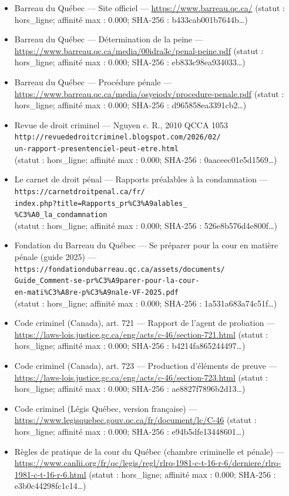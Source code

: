 \documentclass[12pt,letterpaper,oneside]{article}
\begin{document}
\begin{itemize}[leftmargin=*]
\item Barreau du Québec — Site officiel — \url{https://www.barreau.qc.ca/} (statut : hors\_ligne; affinité max : 0.000; SHA-256 : b433cab001b7644b…)
\item Barreau du Québec — Détermination de la peine — \url{https://www.barreau.qc.ca/media/00idra3c/penal-peine.pdf} (statut : hors\_ligne; affinité max : 0.000; SHA-256 : eb833c98ea934033…)
\item Barreau du Québec — Procédure pénale — \url{https://www.barreau.qc.ca/media/osyeiodv/procedure-penale.pdf} (statut : hors\_ligne; affinité max : 0.000; SHA-256 : d965858ea3391cb2…)
\item Revue de droit criminel — Nguyen c. R., 2010 QCCA 1053\\
\texttt{http://revuededroitcriminel.blogspot.com/2026/02/}\\
\texttt{un-rapport-presentenciel-peut-etre.html}\\
{\footnotesize
(statut : hors\_ligne; affinité max : 0.000; SHA-256 : 0aaceec01e5d1569…)
}
\item Le carnet de droit pénal — Rapports préalables à la condamnation —\\
\texttt{https://carnetdroitpenal.ca/fr/}\\
\texttt{index.php?title=Rapports\_pr\%C3\%A9alables\_}\\
\texttt{\%C3\%A0\_la\_condamnation}\\
{\footnotesize (statut : hors\_ligne; affinité max : 0.000; SHA-256 : 526e8b576d4e800f…)}
\item Fondation du Barreau du Québec — Se préparer pour la cour en matière pénale (guide 2025) —\\
\texttt{https://fondationdubarreau.qc.ca/assets/documents/}\\
\texttt{Guide\_Comment-se-pr\%C3\%A9parer-pour-la-cour-}\\
\texttt{en-mati\%C3\%A8re-p\%C3\%A9nale-VF-2025.pdf}\\
{\footnotesize (statut : hors\_ligne; affinité max : 0.000; SHA-256 : 1a531a683a74c51f…)}
\item Code criminel (Canada), art. 721 — Rapport de l'agent de probation — \url{https://laws-lois.justice.gc.ca/eng/acts/c-46/section-721.html} (statut : hors\_ligne; affinité max : 0.000; SHA-256 : b4214fa865244497…)
\item Code criminel (Canada), art. 723 — Production d'éléments de preuve — \url{https://laws-lois.justice.gc.ca/eng/acts/c-46/section-723.html} (statut : hors\_ligne; affinité max : 0.000; SHA-256 : ae8827f7896b2d13…)
\item Code criminel (Légis Québec, version française) — \url{https://www.legisquebec.gouv.qc.ca/fr/document/lc/C-46} (statut : hors\_ligne; affinité max : 0.000; SHA-256 : e94b5dfe13448601…)
\item Règles de pratique de la cour du Québec (chambre criminelle et pénale) — \url{https://www.canlii.org/fr/qc/legis/regl/rlrq-1981-c-t-16-r-6/derniere/rlrq-1981-c-t-16-r-6.html} (statut : hors\_ligne; affinité max : 0.000; SHA-256 : e3b0c44298fc1c14…)


\end{itemize}
\end{document}
